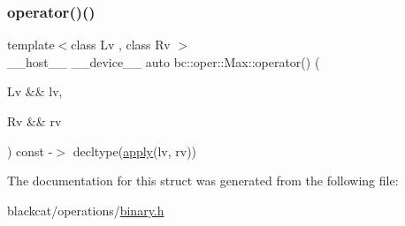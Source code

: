 \mbox{\label{structbc_1_1oper_1_1Max_a40217402cdff8b6fc6aabc042c4ccf31}} 
\subsubsection{\texorpdfstring{operator()()}{operator()()}}
{\footnotesize\ttfamily template$<$class Lv , class Rv $>$ \\
\+\_\+\+\_\+host\+\_\+\+\_\+ \+\_\+\+\_\+device\+\_\+\+\_\+ auto bc\+::oper\+::\+Max\+::operator() (\begin{DoxyParamCaption}\item[{Lv \&\&}]{lv,  }\item[{Rv \&\&}]{rv }\end{DoxyParamCaption}) const -\/$>$ decltype(\hyperlink{structbc_1_1oper_1_1Max_a5679773915eae039e36b1eee4b9aae18}{apply}(lv, rv)) \hspace{0.3cm}{\ttfamily [inline]}}



The documentation for this struct was generated from the following file\+:\begin{DoxyCompactItemize}
\item 
blackcat/operations/\hyperlink{binary_8h}{binary.\+h}\end{DoxyCompactItemize}
